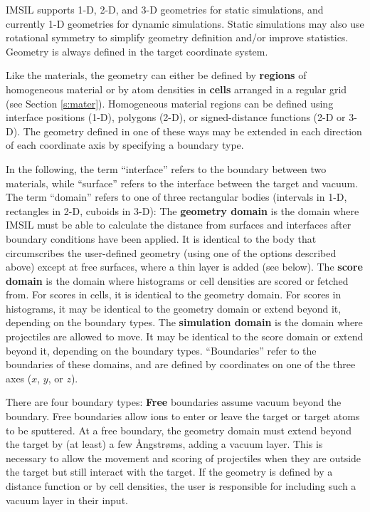 IMSIL supports 1-D, 2-D, and 3-D geometries for static simulations, 
and currently 1-D geometries for dynamic simulations. 
Static simulations may also use rotational symmetry to simplify geometry 
definition and/or improve statistics. 
Geometry is always defined in the target coordinate system.

Like the materials, the geometry can either be defined by \textbf{regions} 
of homogeneous material or by atom densities in \textbf{cells} arranged 
in a regular grid (see Section \ref{s:mater}). 
Homogeneous material regions can be defined using interface positions (1-D), 
polygons (2-D), or signed-distance functions (2-D or 3-D). 
The geometry defined in one of these ways may be extended in each direction 
of each coordinate axis by specifying a boundary type.

In the following, the term ``interface'' refers to the boundary between two
materials, while ``surface'' refers to the interface between the target
and vacuum. 
The term ``domain'' refers to one of three rectangular bodies (intervals in 
1-D, rectangles in 2-D, cuboids in 3-D): 
The \textbf{geometry domain} is the domain where IMSIL must be able to 
calculate the distance from surfaces and interfaces after boundary conditions 
have been applied.
It is identical to the body that circumscribes the user-defined geometry 
(using one of the options described above) except at free surfaces, where
a thin layer is added (see below).
The \textbf{score domain} is the domain where histograms or cell densities 
are scored or fetched from.
For scores in cells, it is identical to the geometry domain. 
For scores in histograms, it may be identical to the geometry domain or extend 
beyond it, depending on the boundary types. 
The \textbf{simulation domain} is the domain where projectiles are allowed 
to move. 
It may be identical to the score domain or extend beyond it, depending on 
the boundary types. 
``Boundaries'' refer to the boundaries of these domains, and are defined by
coordinates on one of the three axes ($x$, $y$, or $z$).

There are four boundary types: 
\textbf{Free} boundaries assume vacuum beyond the boundary. 
Free boundaries allow ions to enter or leave the target or target atoms to 
be sputtered. 
At a free boundary, the geometry domain must extend beyond the target by (at 
least) a few {\AA}ngstr{\o}ms, adding a vacuum layer. 
This is necessary to allow the movement and scoring of projectiles when 
they are outside the target but still interact with the target. 
If the geometry is defined by a distance function or by cell densities, the 
user is responsible for including such a vacuum layer in their input.  

